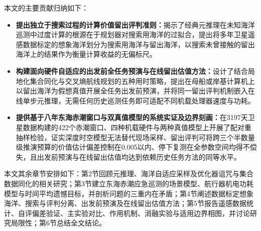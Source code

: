 本文的主要贡献归纳如下：
\begin{itemize}
  \item \textbf{提出独立于搜索过程的计算价值留出评判准则：}揭示了经典元推理在未知海洋巡测中过度计算的根源在于规划器对搜索用海洋的过拟合，提出将多年卫星遥感数据标定的想象海洋划分为搜索用海洋与留出海洋，以搜索未曾接触的留出海洋上的结果作为衡量计算收益的无偏标尺。
  \item \textbf{构建面向硬件自适应的出发前全任务预演与在线留出估值方法：}设计了结合局地化集合同化与交叉熵航线规划的五种用时策略，提出在母船或岸基计算机上以留出海洋为假想真值开展全任务出发前预演，并将同一留出评判机制嵌入在线单步元推理，无需任何历史巡测任务即可适配不同机载处理器速度与功耗。
  \item \textbf{提供基于八年东海赤潮窗口与双真值模型的系统实证及边界刻画：}在3197天卫星数据构建的422个赤潮窗口、四种机载硬件与两种真值模型上开展了配对重抽样检验，证实深度时空模型无法替代现场采样、留出评判可将跨三个半数量级推演预算的价值估计偏差控制在0.005以内、停下复测在全参数空间均得不偿失，且出发前预演与在线留出估值均达到依赖历史任务方法的同等水平。
\end{itemize}

本文其余章节安排如下：第2节回顾元推理、海洋自适应采样及优化器诅咒与集合数据同化的相关研究；第3节建立东海赤潮应急巡测的场景模型、航行器机电功耗模型与时间平均遗憾目标，并剖析问题的三重内在矛盾；第4节阐述数据标定想象海洋、搜索与评判分离、出发前预演及在线留出估值方法；第5节报告遥感数据统计、自评偏差验证、主实验对比、作用机制、消融实验与适用边界相图，并讨论研究局限性；第6节总结全文结论。
